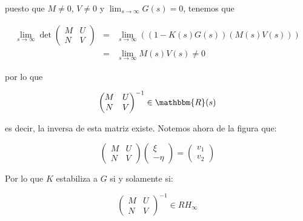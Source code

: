         puesto que $M \ne 0$, $V \ne 0$ y $\lim_{s \to \infty} G(s) = 0$, tenemos que

        \begin{eqnarray*}
            \lim_{s \to \infty} \det{
            \begin{pmatrix}
                M & U \\
                N & V
            \end{pmatrix}
            } & = & \lim_{s \to \infty} \left( \left( 1 - K(s) G(s) \right) \left( M(s) V(s) \right) \right) \\
            & = & \lim_{s \to \infty} M(s) V(s) \ne 0
        \end{eqnarray*}

        por lo que

        \begin{equation*}
            \begin{pmatrix}
                M & U \\
                N & V
            \end{pmatrix}^{-1} \in \mathbbm{R}(s)
        \end{equation*}

        es decir, la inversa de esta matriz existe.
        Notemos ahora de la figura que:

        \begin{equation*}
            \begin{pmatrix}
                M & U \\
                N & V
            \end{pmatrix}
            \begin{pmatrix}
                \xi \\
                - \eta
            \end{pmatrix} =
            \begin{pmatrix}
                v_1 \\
                v_2
            \end{pmatrix}
        \end{equation*}

        Por lo que $K$ estabiliza a $G$ si y solamente si:

        \begin{equation*}
            \begin{pmatrix}
                M & U \\
                N & V
            \end{pmatrix}^{-1} \in RH_{\infty}
        \end{equation*}
